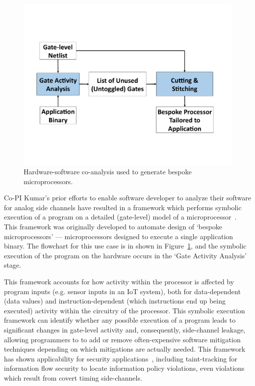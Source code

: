 \begin{figure}
\vspace{-0.15in}
\includegraphics[width=\linewidth]{./figure/Bespoke_Flow_Fig.pdf}
\vspace{-0.3in}
\caption{Hardware-software co-analysis used to generate bespoke microprocessors.}
\label{fig:bespoke}
\end{figure}
Co-PI Kumar's prior efforts to enable software developer to analyze their software for analog side channels have resulted in a framework which performs symbolic execution of a program on a detailed (gate-level) model of a microprocessor~\cite{cherupalli2017}.
This framework was originally developed to automate design of `bespoke microprocessors' --- microprocessors designed to execute a single application binary.
The flowchart for this use case is in shown in Figure~\ref{fig:bespoke}, and the symbolic execution of the program on the hardware occurs in the `Gate Activity Analysis' stage.

This framework accounts for how activity within the processor is affected by program inputs (e.g. sensor inputs in an IoT system), both for data-dependent (data values) and instruction-dependent (which instructions end up being executed) activity within the circuitry of the processor. This symbolic execution framework can identify whether any possible execution of a program leads to significant changes in gate-level activity and, consequently, side-channel leakage, allowing programmers to to add or remove often-expensive software mitigation techniques depending on which mitigations are actually needed. This framework has shown applicability for security applications~\cite{cherupalli20172}, including
taint-tracking for information flow security to locate information policy
violations, even violations which result from covert timing side-channels.

